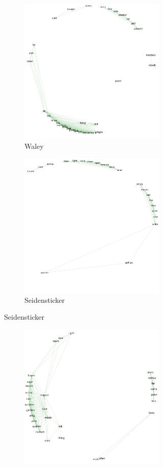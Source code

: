 \documentclass[12pt]{article}
\begin{document}
\begin{flushleft}
\begin{spacing}{2.0}
\begin{figure}
	\begin{subfigure}{\linewidth}
		\begin{subfigure}{.5\linewidth}
			\includegraphics[width=3in]{waley-no-menwords.png}
			\caption{Waley}		
	  	\end{subfigure}
	  	\begin{subfigure}{.5\linewidth}
			\includegraphics[width=3in]{seidensticker-no-menwords.png}\hfill
			\caption{Seidensticker}
	  	\end{subfigure}
	\end{subfigure}\par\medskip
	\begin{subfigure}{\linewidth}	  	
		\begin{subfigure}{.5\linewidth}
	  		\includegraphics[width=3in]{tyler-no-menwords.png}\hfill

\end{subfigure}
\end{subfigure}
\end{figure}
\end{spacing}
\end{flushleft}
\end{document}

